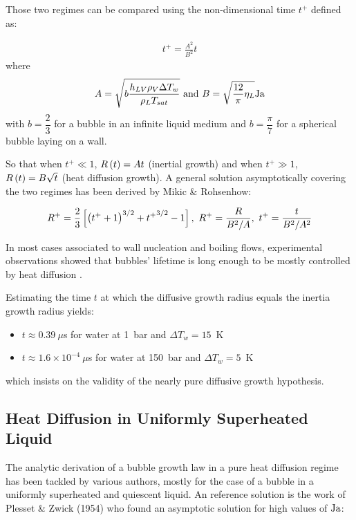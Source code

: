 Those two regimes can be compared using the non-dimensional time $t^{+}$ defined as:

\begin{align}
t^{+} = \frac{A^{2}}{B^{2}}t
\end{align}
where
\begin{equation}
A=\sqrt{b \frac{h_{LV}\rho_{V} \Delta T_{w} }{\rho_{L}T_{sat}} } \ \text{and}\ B=\sqrt{\frac{12}{\pi}\eta_{L}}\Ja
\end{equation}
with $b=\dfrac{2}{3}$ for a bubble in an infinite liquid medium and $b=\dfrac{\pi}{7}$ for a spherical bubble laying on a wall.

\npar

So that when $t^{+} \ll 1$, $R\left( t \right) = At$ (inertial growth) and when $t^{+} \gg 1$, $R\left( t \right)=B\sqrt{t}$ (heat diffusion growth). A general solution asymptotically covering the two regimes has been derived by Mikic \& Rohsenhow:

\begin{equation}
R^{+} = \frac{2}{3}\crocht{\parth{t^{+}+1}^{3/2}+{t^{+}}^{3/2}-1},\ R^{+}=\frac{R}{B^{2}/A},\ t^{+}=\frac{t}{B^{2}/A^{2}}
\end{equation}


In most cases associated to wall nucleation and boiling flows, experimental observations showed that bubbles' lifetime is long enough to be mostly controlled by heat diffusion \cite{kossolapov_experimental_2021, maity_effect_2000, zhou_experimental_2020}.

\begin{remark*}{}
Estimating the time $t$ at which the diffusive growth radius equals the inertia growth radius yields:
\begin{itemize}
\item $t\approx 0.39\ \mu$s for water at 1\ bar and $\Delta T_{w}=15$\ K
\item $t\approx 1.6\times 10^{-4}\ \mu$s for water at 150\ bar and $\Delta T_{w}=5$\ K
\end{itemize}
which insists on the validity of the nearly pure diffusive growth hypothesis.
\end{remark*}

\subsection{Heat Diffusion in Uniformly Superheated Liquid}

The analytic derivation of a bubble growth law in a pure heat diffusion regime has been tackled by various authors, mostly for the case of a bubble in a uniformly superheated and quiescent liquid. An reference solution is the work of Plesset \& Zwick (1954) \cite{plesset_growth_1954} who found an asymptotic solution for high values of $\mathrm{Ja}$:

